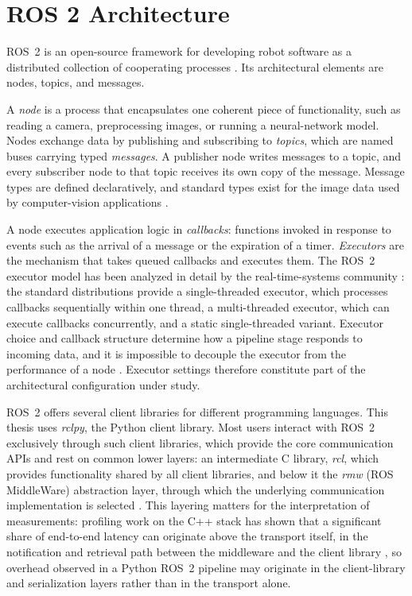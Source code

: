 \section{ROS 2 Architecture}
\label{sec:ros2}

ROS~2 is an open-source framework for developing robot software as a
distributed collection of cooperating processes \cite{macenski2022,zotero-item-9}. Its architectural elements are nodes, topics, and messages.

A \emph{node} is a process that encapsulates one coherent piece of
functionality, such as reading a camera, preprocessing images, or running
a neural-network model. Nodes exchange data by publishing and subscribing
to \emph{topics}, which are named buses carrying typed \emph{messages}. A
publisher node writes messages to a topic, and every subscriber node to
that topic receives its own copy of the message. Message types are defined
declaratively, and standard types exist for the image data used by
computer-vision applications \cite{macenski2022, zotero-item-9}.

A node executes application logic in \emph{callbacks}: functions invoked
in response to events such as the arrival of a message or the expiration
of a timer. \emph{Executors} are the mechanism that takes queued callbacks
and executes them. The ROS~2 executor model has been analyzed in detail by
the real-time-systems community \cite{casini2026}: the standard
distributions provide a single-threaded executor, which processes
callbacks sequentially within one thread, a multi-threaded executor, which
can execute callbacks concurrently, and a static single-threaded variant.
Executor choice and callback structure determine how a pipeline stage
responds to incoming data, and it is impossible to decouple the executor
from the performance of a node \cite{macenski2023, casini2026}. Executor
settings therefore constitute part of the architectural configuration
under study.

ROS~2 offers several client libraries for different programming languages.
This thesis uses \emph{rclpy}, the Python client library. Most users
interact with ROS~2 exclusively through such client libraries, which
provide the core communication APIs and rest on common lower layers: an
intermediate C library, \emph{rcl}, which provides functionality shared by
all client libraries, and below it the \emph{rmw} (ROS MiddleWare)
abstraction layer, through which the underlying communication
implementation is selected \cite{macenski2022, zotero-item-9}. This
layering matters for the interpretation of measurements: profiling work on
the C++ stack has shown that a significant share of end-to-end latency can
originate above the transport itself, in the notification and retrieval
path between the middleware and the client library
\cite{kronauer2021, kamiya2025}, so overhead observed in a Python ROS~2
pipeline may originate in the client-library and serialization layers
rather than in the transport alone.

